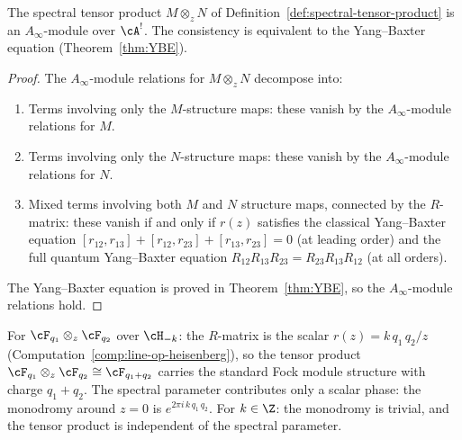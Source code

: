 \begin{proposition}
The spectral tensor product $M\otimes_z N$
of Definition~\textup{\ref{def:spectral-tensor-product}}
is an $A_\infty$-module over $\cA^!$. The consistency
is equivalent to the Yang--Baxter equation
(Theorem~\textup{\ref{thm:YBE}}).
\end{proposition}

\begin{proof}
The $A_\infty$-module relations for $M\otimes_z N$
decompose into:
\begin{enumerate}[label=(\roman*)]
\item Terms involving only the $M$-structure maps:
 these vanish by the $A_\infty$-module relations for $M$.
\item Terms involving only the $N$-structure maps:
 these vanish by the $A_\infty$-module relations for $N$.
\item Mixed terms involving both $M$ and $N$ structure
 maps, connected by the $R$-matrix: these vanish if and
 only if $r(z)$ satisfies the classical Yang--Baxter
 equation $[r_{12},r_{13}]+[r_{12},r_{23}]+[r_{13},r_{23}]=0$
 (at leading order) and the full quantum Yang--Baxter
 equation $R_{12}R_{13}R_{23}=R_{23}R_{13}R_{12}$
 (at all orders).
\end{enumerate}
The Yang--Baxter equation is proved in
Theorem~\ref{thm:YBE}, so the $A_\infty$-module relations
hold.
\end{proof}

\begin{computation}
For $\cF_{q_1}\otimes_z\cF_{q_2}$ over $\cH_{-k}$:
the $R$-matrix is the scalar $r(z)=k\,q_1\,q_2/z$
(Computation~\ref{comp:line-op-heisenberg}), so the
tensor product $\cF_{q_1}\otimes_z\cF_{q_2}
\cong\cF_{q_1+q_2}$
carries the standard Fock module structure with charge
$q_1+q_2$. The spectral parameter contributes only a
scalar phase: the monodromy around $z=0$ is
$e^{2\pi i\,k\,q_1\,q_2}$. For $k\in\Z$: the
monodromy is trivial, and the tensor product is
independent of the spectral parameter.
\end{computation}

